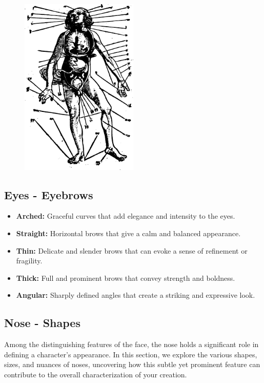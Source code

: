 \documentclass[12pt]{book}  %
\begin{document}
\begin{figure}[h]
    \centering
    \includegraphics[width=0.5\textwidth]{./images/physical_04.pdf}
\end{figure}

\subsection{\textbf{Eyes - Eyebrows}}

\begin{itemize}
    \item \textbf{Arched:} Graceful curves that add elegance and intensity to the eyes.
    \item \textbf{Straight:} Horizontal brows that give a calm and balanced appearance.
    \item \textbf{Thin:} Delicate and slender brows that can evoke a sense of refinement or fragility.
    \item \textbf{Thick:} Full and prominent brows that convey strength and boldness.
    \item \textbf{Angular:} Sharply defined angles that create a striking and expressive look.
\end{itemize}

\subsection{\textbf{Nose - Shapes}}

Among the distinguishing features of the face, the nose holds a significant role in defining a character's appearance. In this section, we explore the various shapes, sizes, and nuances of noses, uncovering how this subtle yet prominent feature can contribute to the overall characterization of your creation.
\end{document}
